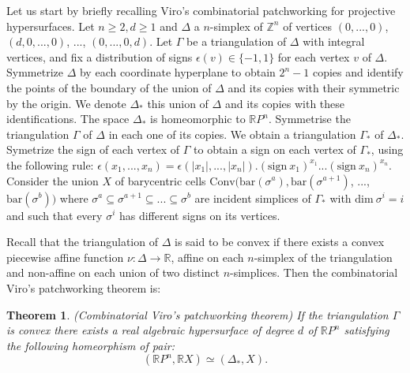 \documentclass{article}
\newtheorem{theorem}{Theorem}
\begin{document}
Let us start by briefly recalling Viro’s combinatorial patchworking for projective hypersurfaces. Let $n\geq 2, d\geq1$ and $\Delta$ a $n$-simplex of $\mathbb{Z}^n$ of vertices $(0,...,0)$, $(d,0,...,0)$, $...$, $(0,...,0,d)$. Let $\Gamma$ be a triangulation of $\Delta$ with integral vertices, and fix a distribution of signs $\epsilon(v)\in\{-1,1\}$ for each vertex $v$ of $\Delta$. Symmetrize $\Delta$ by each coordinate hyperplane to obtain $2^n-1$ copies and identify the points of the boundary of the union of $\Delta$ and its copies with their symmetric by the origin. We denote $\Delta_*$ this union of $\Delta$ and its copies with these identifications. The space $\Delta_*$ is homeomorphic to $\mathbb{R}P^n$. Symmetrise the triangulation $\Gamma$ of $\Delta$ in each one of its copies. We obtain a triangulation $\Gamma_*$ of $\Delta_*$. Symetrize the sign of each vertex of $\Gamma$ to obtain a sign on each vertex of $\Gamma_*$, using the following rule: $ \epsilon(x_1,...,x_n) = \epsilon(|x_1|,...,|x_n|).(\mathrm{sign} ~ x_1)^{x_1}...(\mathrm{sign} ~ x_n)^{x_n}$. Consider the union $X$ of barycentric cells $\mathrm{Conv}(\mathrm{bar}(\sigma^a),\mathrm{bar}(\sigma^{a+1})$, $...$, $\mathrm{bar}(\sigma^b))$ where $\sigma^a\subseteq \sigma^{a+1}\subseteq ... \subseteq \sigma^b$ are incident simplices of $\Gamma_*$ with $\mathrm{dim}~\sigma^i =i$ and such that every $\sigma^i$ has different signs on its vertices.

Recall that the triangulation of $\Delta$ is said to be convex if there exists a convex piecewise affine function $\nu: \Delta \rightarrow \mathbb{R}$, affine on each $n$-simplex of the triangulation and non-affine on each union of two distinct $n$-simplices. Then the combinatorial Viro's patchworking theorem is:

\begin{theorem}
    (Combinatorial Viro's patchworking theorem) If the triangulation $\Gamma$ is convex there exists a real algebraic hypersurface of degree $d$ of $\mathbb{R}P^n$ satisfying the following homeorphism of pair:
    \begin{equation*}
        (\mathbb{R}P^n,\mathbb{R}X) \simeq (\Delta_*,X).
    \end{equation*}
\end{theorem}
\end{document}
